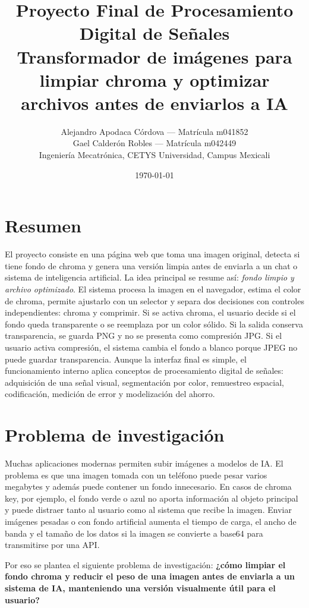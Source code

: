 \documentclass[12pt,letterpaper]{article}
\title{\textbf{Proyecto Final de Procesamiento Digital de Señales}\\
Transformador de imágenes para limpiar chroma y optimizar archivos antes de enviarlos a IA}
\author{
Alejandro Apodaca Córdova --- Matrícula m041852\\
Gael Calderón Robles --- Matrícula m042449\\
Ingeniería Mecatrónica, CETYS Universidad, Campus Mexicali
}
\date{\today}
\begin{document}
\maketitle

\section*{Resumen}
El proyecto consiste en una página web que toma una imagen original, detecta si tiene fondo de chroma y genera una versión limpia antes de enviarla a un chat o sistema de inteligencia artificial. La idea principal se resume así: \textit{fondo limpio y archivo optimizado}. El sistema procesa la imagen en el navegador, estima el color de chroma, permite ajustarlo con un selector y separa dos decisiones con controles independientes: chroma y comprimir. Si se activa chroma, el usuario decide si el fondo queda transparente o se reemplaza por un color sólido. Si la salida conserva transparencia, se guarda PNG y no se presenta como compresión JPG. Si el usuario activa compresión, el sistema cambia el fondo a blanco porque JPEG no puede guardar transparencia. Aunque la interfaz final es simple, el funcionamiento interno aplica conceptos de procesamiento digital de señales: adquisición de una señal visual, segmentación por color, remuestreo espacial, codificación, medición de error y modelización del ahorro.

\section{Problema de investigación}
Muchas aplicaciones modernas permiten subir imágenes a modelos de IA. El problema es que una imagen tomada con un teléfono puede pesar varios megabytes y además puede contener un fondo innecesario. En casos de chroma key, por ejemplo, el fondo verde o azul no aporta información al objeto principal y puede distraer tanto al usuario como al sistema que recibe la imagen. Enviar imágenes pesadas o con fondo artificial aumenta el tiempo de carga, el ancho de banda y el tamaño de los datos si la imagen se convierte a base64 para transmitirse por una API.

Por eso se plantea el siguiente problema de investigación: \textbf{¿cómo limpiar el fondo chroma y reducir el peso de una imagen antes de enviarla a un sistema de IA, manteniendo una versión visualmente útil para el usuario?}
\end{document}
